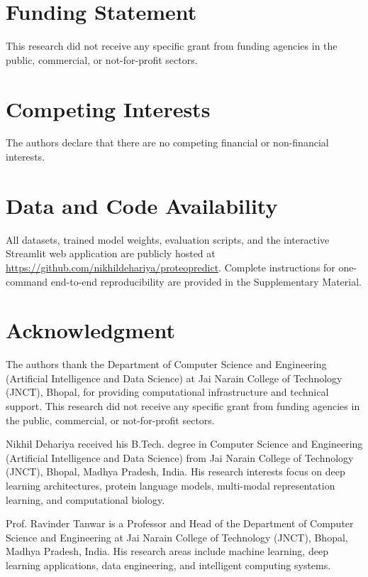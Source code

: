 \documentclass[journal]{IEEEtran}
\begin{document}
\section*{Funding Statement}
This research did not receive any specific grant from funding agencies in the public, commercial, or not-for-profit sectors.

\section*{Competing Interests}
The authors declare that there are no competing financial or non-financial interests.

\section*{Data and Code Availability}
All datasets, trained model weights, evaluation scripts, and the interactive Streamlit web application are publicly hosted at \url{https://github.com/nikhildehariya/proteopredict}. Complete instructions for one-command end-to-end reproducibility are provided in the Supplementary Material.
\section*{Acknowledgment}
The authors thank the Department of Computer Science and Engineering (Artificial Intelligence and Data Science) at Jai Narain College of Technology (JNCT), Bhopal, for providing computational infrastructure and technical support. This research did not receive any specific grant from funding agencies in the public, commercial, or not-for-profit sectors.




\begin{IEEEbiographynophoto}{Nikhil Dehariya}
received his B.Tech. degree in Computer Science and Engineering (Artificial Intelligence and Data Science) from Jai Narain College of Technology (JNCT), Bhopal, Madhya Pradesh, India. His research interests focus on deep learning architectures, protein language models, multi-modal representation learning, and computational biology.
\end{IEEEbiographynophoto}

\begin{IEEEbiographynophoto}{Prof. Ravinder Tanwar}
is a Professor and Head of the Department of Computer Science and Engineering at Jai Narain College of Technology (JNCT), Bhopal, Madhya Pradesh, India. His research areas include machine learning, deep learning applications, data engineering, and intelligent computing systems.
\end{IEEEbiographynophoto}
\end{document}
